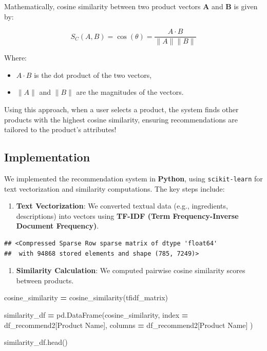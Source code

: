 \documentclass[
]{article}
\newenvironment{Shaded}{\begin{snugshade}}{\end{snugshade}}
\newcommand{\NormalTok}[1]{#1}
\newcommand{\OperatorTok}[1]{\textcolor[rgb]{0.81,0.36,0.00}{\textbf{#1}}}
\newcommand{\StringTok}[1]{\textcolor[rgb]{0.31,0.60,0.02}{#1}}
\providecommand{\tightlist}{%
  \setlength{\itemsep}{0pt}\setlength{\parskip}{0pt}}
\begin{document}
Mathematically, cosine similarity between two product vectors \textbf{A}
and \textbf{B} is given by:

\[
S_C(A, B) = \cos(\theta) = \frac{A \cdot B}{\|A\| \|B\|}
\]

Where:

\begin{itemize}
\tightlist
\item
  \(A \cdot B\) is the dot product of the two vectors,
\item
  \(\|A\|\) and \(\|B\|\) are the magnitudes of the vectors.
\end{itemize}

Using this approach, when a user selects a product, the system finds
other products with the highest cosine similarity, ensuring
recommendations are tailored to the product's attributes!

\subsection{Implementation}\label{implementation}

We implemented the recommendation system in \textbf{Python}, using
\texttt{scikit-learn} for text vectorization and similarity
computations. The key steps include:

\begin{enumerate}
\def\labelenumi{\arabic{enumi}.}
\tightlist
\item
  \textbf{Text Vectorization}: We converted textual data (e.g.,
  ingredients, descriptions) into vectors using \textbf{TF-IDF (Term
  Frequency-Inverse Document Frequency)}.
\end{enumerate}

\begin{verbatim}
## <Compressed Sparse Row sparse matrix of dtype 'float64'
##  with 94868 stored elements and shape (785, 7249)>
\end{verbatim}

\begin{enumerate}
\def\labelenumi{\arabic{enumi}.}
\setcounter{enumi}{1}
\tightlist
\item
  \textbf{Similarity Calculation}: We computed pairwise cosine
  similarity scores between products.
\end{enumerate}

\begin{Shaded}
\begin{Highlighting}[]
\NormalTok{cosine\_similarity }\OperatorTok{=}\NormalTok{ cosine\_similarity(tfidf\_matrix)}

\NormalTok{similarity\_df }\OperatorTok{=}\NormalTok{ pd.DataFrame(cosine\_similarity, }
\NormalTok{                index }\OperatorTok{=}\NormalTok{ df\_recommend2[}\StringTok{\textquotesingle{}Product Name\textquotesingle{}}\NormalTok{], }
\NormalTok{                columns }\OperatorTok{=}\NormalTok{ df\_recommend2[}\StringTok{\textquotesingle{}Product Name\textquotesingle{}}\NormalTok{]}
\NormalTok{                )}

\NormalTok{similarity\_df.head()}
\end{Highlighting}
\end{Shaded}
\end{document}
